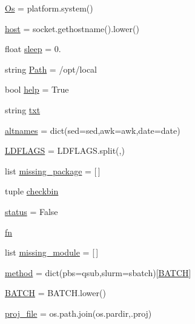 \begin{DoxyCompactItemize}
\item 
\hyperlink{namespacesetup_ad8426f1e8d88dc4a6601f003805f9224}{Os} = platform.\+system()
\item 
\hyperlink{namespacesetup_a26e74581e39df55b9dbba8dcf7d485fe}{host} = socket.\+gethostname().lower()
\item 
float \hyperlink{namespacesetup_aea013977d24d48e57270f412b2c222c2}{sleep} = 0.
\item 
string \hyperlink{namespacesetup_a299d8d9205ed54eac073b608d9ab6af8}{Path} = \textquotesingle{}/opt/local\textquotesingle{}
\item 
bool \hyperlink{namespacesetup_a5dd2d263367c323cbd4d063b156a4a68}{help} = True
\item 
string \hyperlink{namespacesetup_a2429357b780b7445dd4831250478d9ed}{txt}
\item 
\hyperlink{namespacesetup_aaadd587ba3f34c400f5df2cf05a7e1c5}{altnames} = dict(sed=\textquotesingle{}sed\textquotesingle{},awk=\textquotesingle{}awk\textquotesingle{},date=\textquotesingle{}date\textquotesingle{})
\item 
\hyperlink{namespacesetup_ac2fa2127d48feb1a28f2aafa6fd00d0b}{L\+D\+F\+L\+A\+GS} = L\+D\+F\+L\+A\+G\+S.\+split(\textquotesingle{},\textquotesingle{})
\item 
list \hyperlink{namespacesetup_a82d52368b879302df365513569195970}{missing\+\_\+package} = \mbox{[}$\,$\mbox{]}
\item 
tuple \hyperlink{namespacesetup_a38fd627eae7d93f3366e9b4f707e77dd}{checkbin}
\item 
\hyperlink{namespacesetup_ab82b87b5daf568d1c5c3c8fc41e52ca1}{status} = False
\item 
\hyperlink{namespacesetup_a501d41aa25b2969d3234702d4439c931}{fn}
\item 
list \hyperlink{namespacesetup_a9c08eb458bd1b35c49b4aeddb58b03af}{missing\+\_\+module} = \mbox{[}$\,$\mbox{]}
\item 
\hyperlink{namespacesetup_ada820daab4af8948c6a81a2bc70ec3e8}{method} = dict(pbs=\textquotesingle{}qsub\textquotesingle{},slurm=\textquotesingle{}sbatch\textquotesingle{})\mbox{[}\hyperlink{namespacesetup_a5c8a4998256b5c6d0700ac432fa75d4b}{B\+A\+T\+CH}\mbox{]}
\item 
\hyperlink{namespacesetup_a5c8a4998256b5c6d0700ac432fa75d4b}{B\+A\+T\+CH} = B\+A\+T\+C\+H.\+lower()
\item 
\hyperlink{namespacesetup_aac6afb4198c065254f41a7ce8297da6a}{proj\+\_\+file} = os.\+path.\+join(os.\+pardir,\textquotesingle{}.proj\textquotesingle{})

\end{DoxyCompactItemize}
